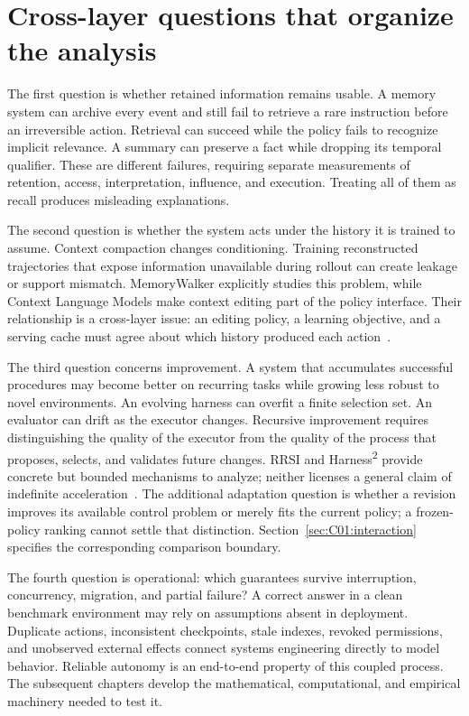 \section{Cross-layer questions that organize the analysis}\label{sec:C01:07}
The first question is whether retained information remains usable. A memory system can archive every event and still fail to retrieve a rare instruction before an irreversible action. Retrieval can succeed while the policy fails to recognize implicit relevance. A summary can preserve a fact while dropping its temporal qualifier. These are different failures, requiring separate measurements of retention, access, interpretation, influence, and execution. Treating all of them as recall produces misleading explanations.

The second question is whether the system acts under the history it is trained to assume. Context compaction changes conditioning. Training reconstructed trajectories that expose information unavailable during rollout can create leakage or support mismatch. MemoryWalker explicitly studies this problem, while Context Language Models make context editing part of the policy interface. Their relationship is a cross-layer issue: an editing policy, a learning objective, and a serving cache must agree about which history produced each action~\cite{j2026memorywalker,shao2026context}.

The third question concerns improvement. A system that accumulates successful procedures may become better on recurring tasks while growing less robust to novel environments. An evolving harness can overfit a finite selection set. An evaluator can drift as the executor changes. Recursive improvement requires distinguishing the quality of the executor from the quality of the process that proposes, selects, and validates future changes. RRSI and Harness\textsuperscript{2} provide concrete but bounded mechanisms to analyze; neither licenses a general claim of indefinite acceleration~\cite{rrsi2026,corpus261014224}. The additional adaptation question is whether a revision improves its available control problem or merely fits the current policy; a frozen-policy ranking cannot settle that distinction. Section~\ref{sec:C01:interaction} specifies the corresponding comparison boundary.

The fourth question is operational: which guarantees survive interruption, concurrency, migration, and partial failure? A correct answer in a clean benchmark environment may rely on assumptions absent in deployment. Duplicate actions, inconsistent checkpoints, stale indexes, revoked permissions, and unobserved external effects connect systems engineering directly to model behavior. Reliable autonomy is an end-to-end property of this coupled process. The subsequent chapters develop the mathematical, computational, and empirical machinery needed to test it.
